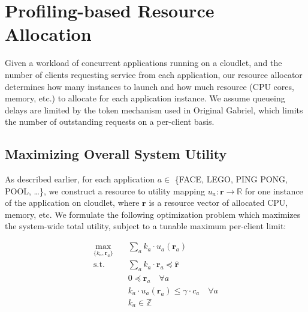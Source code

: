 \section{Profiling-based Resource Allocation}
\label{sec: resource-allocation}

Given a workload of concurrent applications running on a cloudlet, and the
number of clients requesting service from each application, our resource
allocator determines how many instances to launch and how much resource (CPU
cores, memory, etc.) to allocate for each application instance.  We assume
queueing delays are limited by the token mechanism used in Original Gabriel,
which limits the number of outstanding requests on a per-client basis.


\subsection{Maximizing Overall System Utility}

As described earlier, for each application $a \in $ \{FACE, LEGO, PING PONG, POOL, \ldots \},
we construct a resource to utility mapping
$u_a: \mathbf{r} \rightarrow \mathbb{R}$ for one instance of the application on cloudlet,
where $\mathbf{r}$ is a resource vector of allocated CPU, memory, etc. We formulate the
following optimization problem which maximizes the system-wide total utility,
subject to a tunable maximum per-client limit:

\begin{equation}
  \begin{aligned}
    \max_{\{k_a, \mathbf{r}_a\}} \quad & \sum_a{k_a \cdot u_a(\mathbf{r}_a)}                              \\
    \textrm{s.t.} \quad                & \sum_a k_a \cdot \mathbf{r}_a \preccurlyeq \hat{\mathbf{r}}      \\
                                       & 0 \preccurlyeq \mathbf{r}_a  \quad \forall a                     \\
                                       & k_a \cdot u_a(\mathbf{r}_a) \le \gamma \cdot c_a \quad \forall a \\
                                       & k_a \in \mathbb{Z}
  \end{aligned}
\end{equation}

